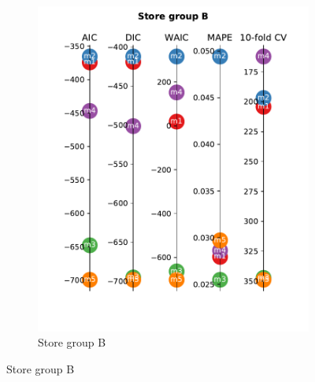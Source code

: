 \documentclass[english, 12pt, a4paper, sci, utf8, a-1b, online]{aaltothesis}
\begin{document}
\begin{abstractpage}[english]
\begin{figure}
\begin{subfigure}[htb]{0.5\textwidth}
		\includegraphics[width=\textwidth]{../plots/metrics/metrics_plot_B.pdf}
		\caption{Store group B}
		\label{fig:metrics_B}
	\end{subfigure}
	

\end{figure}
\end{abstractpage}
\end{document}

